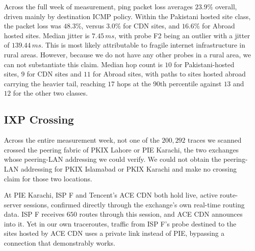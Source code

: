\documentclass[sigconf,anonymous,10pt]{acmart}
\begin{document}
Across the full week of measurement, ping packet loss averages $23.9\%$ overall, driven mainly by destination ICMP policy. Within the Pakistani hosted site class, the packet loss was $48.3\%$, versus $3.0\%$ for CDN sites, and $16.6\%$ for Abroad hosted sites. Median jitter is $7.45\,ms$, with probe F2 being an outlier with a jitter of $139.44\,ms$. This is most likely attributable to fragile internet infrastructure in rural areas. However, because we do not have any other probes in a rural area, we can not substantiate this claim. Median hop count is $10$ for Pakistani-hosted sites, $9$ for CDN sites and $11$ for Abroad sites, with paths to sites hosted abroad carrying the heavier tail, reaching $17$ hops at the 90th percentile against $13$ and $12$ for the other two classes.




\subsection{IXP Crossing }
\label{sec:rq1}

Across the entire measurement week, not one of the $200,292$ traces we scanned crossed the peering fabric of PKIX Lahore or PIE Karachi, the two exchanges whose peering-LAN addressing we could verify. We could not obtain the peering-LAN addressing for PKIX Islamabad or PKIX Karachi and make no crossing claim for those two locations. %

At PIE Karachi, ISP F and Tencent's ACE CDN both hold live, active route-server sessions, confirmed directly through the exchange's own real-time routing data. ISP F receives $650$ routes through this session, and ACE CDN announces into it. Yet in our own traceroutes, traffic from ISP F's probe destined to the sites hosted by ACE CDN uses a private link instead of PIE, bypassing a connection that demonstrably works.
\end{document}
